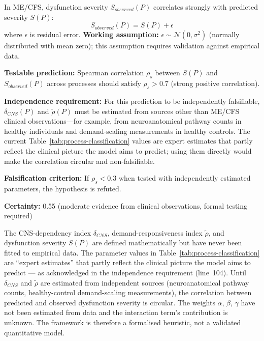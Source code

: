 \begin{hypothesis}
\label{hyp:selective-dysfunction}
In ME/CFS, dysfunction severity $S_{observed}(P)$ correlates strongly with predicted severity $S(P)$:
\[
S_{observed}(P) = S(P) + \epsilon
\]
where $\epsilon$ is residual error. \textbf{Working assumption:} $\epsilon \sim \mathcal{N}(0, \sigma^2)$ (normally distributed with mean zero); this assumption requires validation against empirical data.

\textbf{Testable prediction:} Spearman correlation $\rho_s$ between $S(P)$ and $S_{observed}(P)$ across processes should satisfy $\rho_s > 0.7$ (strong positive correlation).

\textbf{Independence requirement:} For this prediction to be independently falsifiable, $\delta_{CNS}(P)$ and $\tilde{\rho}(P)$ must be estimated from sources other than ME/CFS clinical observations---for example, from neuroanatomical pathway counts in healthy individuals and demand-scaling measurements in healthy controls. The current Table~\ref{tab:process-classification} values are expert estimates that partly reflect the clinical picture the model aims to predict; using them directly would make the correlation circular and non-falsifiable.

\textbf{Falsification criterion:} If $\rho_s < 0.3$ when tested with independently estimated parameters, the hypothesis is refuted.

\textbf{Certainty:} 0.55 (moderate evidence from clinical observations, formal testing required)
\end{hypothesis}

\begin{limitation}
The CNS-dependency index $\delta_{CNS}$, demand-responsiveness index $\tilde{\rho}$, and dysfunction severity $S(P)$ are defined mathematically but have never been fitted to empirical data. The parameter values in Table~\ref{tab:process-classification} are ``expert estimates'' that partly reflect the clinical picture the model aims to predict --- as acknowledged in the independence requirement (line~104). Until $\delta_{CNS}$ and $\tilde{\rho}$ are estimated from independent sources (neuroanatomical pathway counts, healthy-control demand-scaling measurements), the correlation between predicted and observed dysfunction severity is circular. The weights $\alpha$, $\beta$, $\gamma$ have not been estimated from data and the interaction term's contribution is unknown. The framework is therefore a formalised heuristic, not a validated quantitative model.
\end{limitation}


